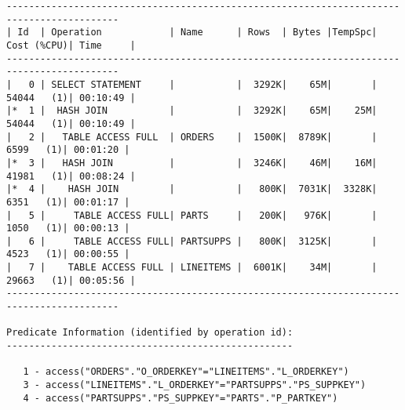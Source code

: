 \documentclass[10pt]{article}
\begin{document}
\begin{lstlisting}[style=queryexecutionplan]
------------------------------------------------------------------------------------------
| Id  | Operation            | Name      | Rows  | Bytes |TempSpc| Cost (%CPU)| Time     |
------------------------------------------------------------------------------------------
|   0 | SELECT STATEMENT     |           |  3292K|    65M|       | 54044   (1)| 00:10:49 |
|*  1 |  HASH JOIN           |           |  3292K|    65M|    25M| 54044   (1)| 00:10:49 |
|   2 |   TABLE ACCESS FULL  | ORDERS    |  1500K|  8789K|       |  6599   (1)| 00:01:20 |
|*  3 |   HASH JOIN          |           |  3246K|    46M|    16M| 41981   (1)| 00:08:24 |
|*  4 |    HASH JOIN         |           |   800K|  7031K|  3328K|  6351   (1)| 00:01:17 |
|   5 |     TABLE ACCESS FULL| PARTS     |   200K|   976K|       |  1050   (1)| 00:00:13 |
|   6 |     TABLE ACCESS FULL| PARTSUPPS |   800K|  3125K|       |  4523   (1)| 00:00:55 |
|   7 |    TABLE ACCESS FULL | LINEITEMS |  6001K|    34M|       | 29663   (1)| 00:05:56 |
------------------------------------------------------------------------------------------
 
Predicate Information (identified by operation id):
---------------------------------------------------
 
   1 - access("ORDERS"."O_ORDERKEY"="LINEITEMS"."L_ORDERKEY")
   3 - access("LINEITEMS"."L_ORDERKEY"="PARTSUPPS"."PS_SUPPKEY")
   4 - access("PARTSUPPS"."PS_SUPPKEY"="PARTS"."P_PARTKEY")
\end{lstlisting}
\end{document}
